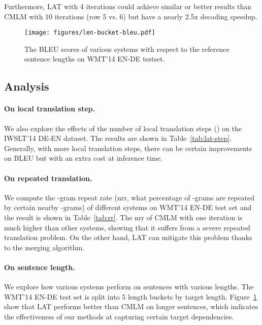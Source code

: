 \documentclass[11pt,a4paper]{article}
\begin{document}
Furthermore, LAT with 4 iterations could achieve similar or better results than CMLM with 10 iterations (row 5 vs. 6) but have a nearly 2.5x decoding speedup.
\begin{figure}[!ht]
    \centering
    \texttt{[image: figures/len-bucket-bleu.pdf]}
    \caption{The BLEU scores of various systems with respect to the reference sentence lengths on WMT'14 EN-DE testset.}
    \label{fig:bleu-len-bucket}
\end{figure}
\subsection{Analysis}
\paragraph{On local translation step.}
We also explore the effects of the number of local translation steps () on the IWSLT'14 DE-EN dataset.
The results are shown in Table~\ref{tab:lat-step}. Generally, with more local translation steps, there can be certain improvements on BLEU but with an extra cost at inference time.
\paragraph{On repeated translation.}
We compute the -gram repeat rate (nrr, what percentage of -grams are repeated by certain nearby -grams) of different systems on WMT'14 EN-DE test set and the result is shown in Table~\ref{tab:rr}. The nrr of CMLM with one iteration is much higher than other systems, showing that it suffers from a severe repeated translation problem. On the other hand, LAT can mitigate this problem thanks to the merging algorithm.
\paragraph{On sentence length.}
We explore how various systems perform on sentences with various lengths. The WMT'14 EN-DE test set is split into 5 length buckets by target length. Figure~\ref{fig:bleu-len-bucket} show that LAT performs better than CMLM on longer sentences, which indicates the effectiveness of our methods at capturing certain target dependencies.
\end{document}
